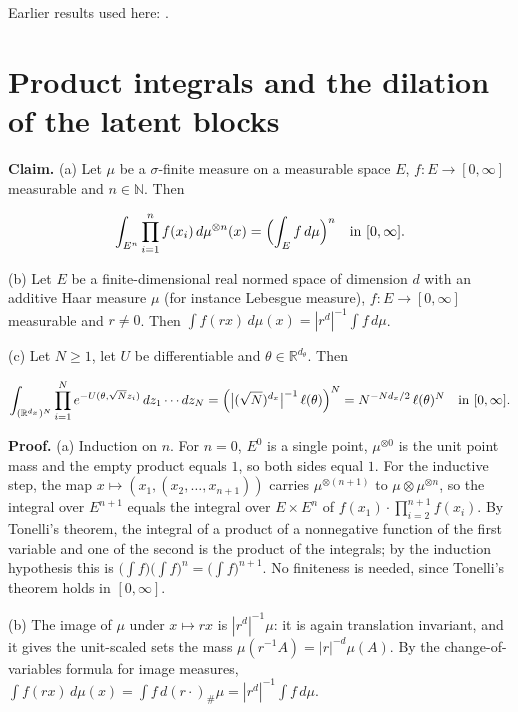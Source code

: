 \documentclass[11pt,a4paper]{article}
\begin{document}
Earlier results used here: \cite[Section~3.26.4]{LangevinLean2026ULASC}.

\section{\texorpdfstring{Product integrals and the dilation of the latent blocks}{Product integrals and the dilation of the latent blocks}}


\textbf{Claim.} (a) Let \(\mu\) be a \(\sigma\)-finite measure on a measurable space \(E\), \(f:E\to[0,\infty]\) measurable and \(n\in\mathbb N\). Then


\[\int_{E^n}\prod_{i=1}^nf(x_i)\,d\mu^{\otimes n}(x)=\Bigl(\int_Ef\,d\mu\Bigr)^n\quad\text{in }[0,\infty].\]


(b) Let \(E\) be a finite-dimensional real normed space of dimension \(d\) with an additive Haar measure \(\mu\) (for instance Lebesgue measure), \(f:E\to[0,\infty]\) measurable and \(r\ne0\). Then \(\int f(rx)\,d\mu(x)=|r^d|^{-1}\int f\,d\mu\).




(c) Let \(N\ge1\), let \(U\) be differentiable and \(\theta\in\mathbb R^{d_\theta}\). Then


\[\int_{(\mathbb R^{d_x})^N}\prod_{i=1}^Ne^{-U(\theta,\sqrt Nz_i)}\,dz_1\cdots dz_N=\Bigl(\bigl|(\sqrt N)^{d_x}\bigr|^{-1}\,\ell(\theta)\Bigr)^N=N^{-Nd_x/2}\,\ell(\theta)^N\quad\text{in }[0,\infty].\]


\textbf{Proof.} (a) Induction on \(n\). For \(n=0\), \(E^0\) is a single point, \(\mu^{\otimes0}\) is the unit point mass and the empty product equals \(1\), so both sides equal \(1\). For the inductive step, the map \(x\mapsto(x_1,(x_2,\dots,x_{n+1}))\) carries \(\mu^{\otimes(n+1)}\) to \(\mu\otimes\mu^{\otimes n}\), so the integral over \(E^{n+1}\) equals the integral over \(E\times E^n\) of \(f(x_1)\cdot\prod_{i=2}^{n+1}f(x_i)\). By Tonelli's theorem, the integral of a product of a nonnegative function of the first variable and one of the second is the product of the integrals; by the induction hypothesis this is \(\bigl(\int f\bigr)\bigl(\int f\bigr)^n=\bigl(\int f\bigr)^{n+1}\). No finiteness is needed, since Tonelli's theorem holds in \([0,\infty]\).




(b) The image of \(\mu\) under \(x\mapsto rx\) is \(|r^d|^{-1}\mu\): it is again translation invariant, and it gives the unit-scaled sets the mass \(\mu(r^{-1}A)=|r|^{-d}\mu(A)\). By the change-of-variables formula for image measures, \(\int f(rx)\,d\mu(x)=\int f\,d(r\cdot)_\#\mu=|r^d|^{-1}\int f\,d\mu\).
\end{document}
